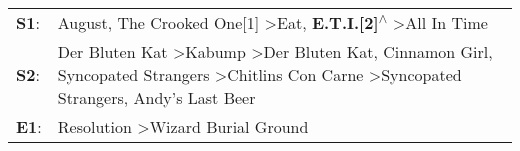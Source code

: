 \begin{supertabular}{p{0.03\textwidth}p{0.92\textwidth}}
 \textbf{S1}:  &                                                                                                                                                                          August\textsuperscript{}, \enspace The Crooked One[1]\textsuperscript{} \textgreater \enspace Eat\textsuperscript{}, \enspace \textbf{E.T.I.[2]\textsuperscript{$\wedge$}} \textgreater \enspace All In Time\textsuperscript{}  \enspace  \\
 \textbf{S2}:  &  Der Bluten Kat\textsuperscript{} \textgreater \enspace Kabump\textsuperscript{} \textgreater \enspace Der Bluten Kat\textsuperscript{}, \enspace Cinnamon Girl\textsuperscript{}, \enspace Syncopated Strangers\textsuperscript{} \textgreater \enspace Chitlins Con Carne\textsuperscript{} \textgreater \enspace Syncopated Strangers\textsuperscript{}, \enspace Andy's Last Beer\textsuperscript{}  \enspace  \\
 \textbf{E1}:  &                                                                                                                                                                                                                                                                                                               Resolution\textsuperscript{} \textgreater \enspace Wizard Burial Ground\textsuperscript{}  \enspace  \\
\end{supertabular}

